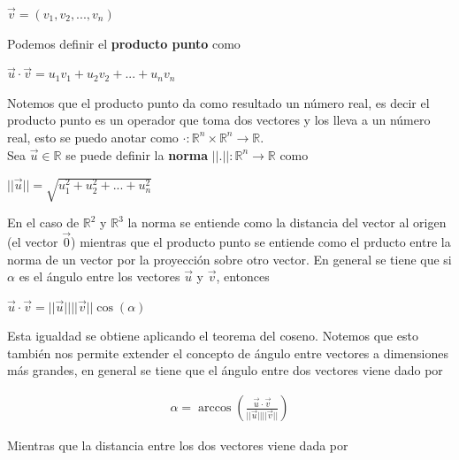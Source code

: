 \documentclass{article}
\theoremstyle{plain}
\theoremstyle{definition}
\begin{document}
\begin{center}
$\overrightarrow{v} = (v_1,v_2,... ,v_n)$
\end{center}


Podemos definir el \textbf{ producto punto } como



\begin{center}
$\overrightarrow{u} \cdot \overrightarrow{v} = u_1v_1+u_2v_2+... +u_nv_n$
\end{center}


Notemos que el producto punto da como resultado un número real, es decir el producto punto es un operador que toma dos vectores y los lleva a un número real, esto se puedo anotar como $\cdot : \mathbb{R}^n \times \mathbb{R}^n \to \mathbb{R}$. \\

Sea $\overrightarrow{u} \in \mathbb{R}$ se puede definir la \textbf{norma}  $||.|| :\mathbb{R}^n \to \mathbb{R}$ como

\begin{center}
$|| \overrightarrow{u} || = \sqrt{u_1^2+u_2^2 +... +u_n^2}$
\end{center}

En el caso de $\mathbb{R}^2$ y $\mathbb{R}^3$ la norma se entiende como la distancia del vector al origen (el vector $\overrightarrow{0}$) mientras que el producto punto se entiende como el prducto entre la norma de un vector por la proyección sobre otro vector. En general se tiene que si $\alpha$ es el ángulo entre los vectores $\overrightarrow{u}$ y $\overrightarrow{v}$, entonces

\begin{center}
$\overrightarrow{u} \cdot \overrightarrow{v} = ||\overrightarrow{u}|| ||\overrightarrow{v}|| \cos(\alpha)$
\end{center}

Esta igualdad se obtiene aplicando el teorema del coseno. Notemos que esto también nos permite extender el concepto de ángulo entre vectores a dimensiones más grandes, en general se tiene que el ángulo entre dos vectores viene dado por

\begin{align*}
\displaystyle \alpha = \arccos \left( \frac{\overrightarrow{u} \cdot \overrightarrow{v}}{||\overrightarrow{u}|| || \overrightarrow{v}||} \right)
\end{align*}

Mientras que la distancia entre los dos vectores viene dada por
\end{document}
